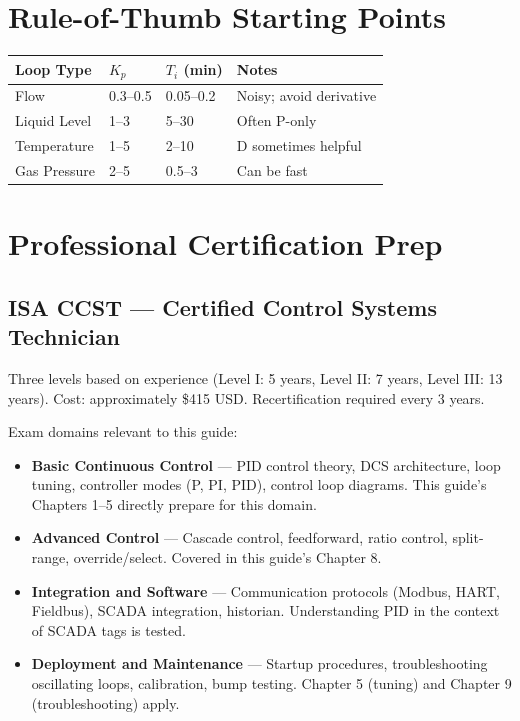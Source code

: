 \documentclass[12pt,twoside,openright]{memoir}
\begin{document}
\section{Rule-of-Thumb Starting Points}

\begin{center}
\begin{tabular}{@{}L{3cm}C{2.5cm}C{2.5cm}L{5cm}@{}}
\toprule
{}
\textbf{Loop Type} & $K_p$ & $T_i$ (min) & \textbf{Notes} \\
\midrule
Flow & 0.3--0.5 & 0.05--0.2 & Noisy; avoid derivative \\
Liquid Level & 1--3 & 5--30 & Often P-only \\
Temperature & 1--5 & 2--10 & D sometimes helpful \\
Gas Pressure & 2--5 & 0.5--3 & Can be fast \\
\bottomrule
\end{tabular}
\end{center}

\section{Professional Certification Prep}

\subsection{ISA CCST --- Certified Control Systems Technician}

Three levels based on experience (Level I: 5 years, Level II: 7 years, Level III: 13 years). Cost: approximately \$415 USD. Recertification required every 3 years.

\noindent Exam domains relevant to this guide:
\begin{itemize}
\item \textbf{Basic Continuous Control} --- PID control theory, DCS architecture, loop tuning, controller modes (P, PI, PID), control loop diagrams. This guide's Chapters 1--5 directly prepare for this domain.
\item \textbf{Advanced Control} --- Cascade control, feedforward, ratio control, split-range, override/select. Covered in this guide's Chapter 8.
\item \textbf{Integration and Software} --- Communication protocols (Modbus, HART, Fieldbus), SCADA integration, historian. Understanding PID in the context of SCADA tags is tested.
\item \textbf{Deployment and Maintenance} --- Startup procedures, troubleshooting oscillating loops, calibration, bump testing. Chapter 5 (tuning) and Chapter 9 (troubleshooting) apply.
\end{itemize}
\end{document}
